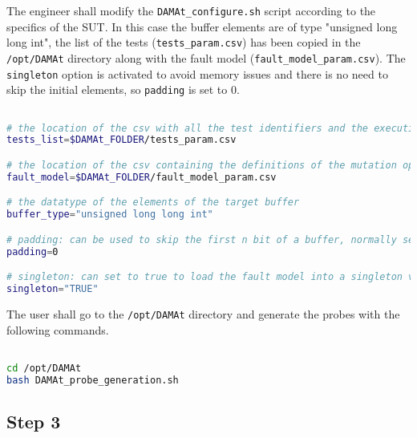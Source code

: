 The engineer shall modify the \texttt{DAMAt\_configure.sh} script according to the specifics of the SUT.
In this case the buffer elements are of type "unsigned long long int", the list of the tests (\texttt{tests\_param.csv}) has been copied in the \texttt{/opt/DAMAt} directory along with the fault model (\texttt{fault\_model\_param.csv}).
The \texttt{singleton} option is activated to avoid memory issues and there is no need to skip the initial elements, so \texttt{padding} is set to 0.

\begin{lstlisting}[language=bash]

# the location of the csv with all the test identifiers and the execution time
tests_list=$DAMAt_FOLDER/tests_param.csv

# the location of the csv containing the definitions of the mutation operators
fault_model=$DAMAt_FOLDER/fault_model_param.csv

# the datatype of the elements of the target buffer
buffer_type="unsigned long long int"

# padding: can be used to skip the first n bit of a buffer, normally set to 0
padding=0

# singleton: can set to true to load the fault model into a singleton variable, normally set to "TRUE", can also  be set to "FALSE"
singleton="TRUE"

\end{lstlisting}

The user shall go to the \texttt{/opt/DAMAt} directory and generate the probes with the following commands.

\begin{lstlisting}[language=bash]

cd /opt/DAMAt
bash DAMAt_probe_generation.sh

\end{lstlisting}


\subsection{Step 3}

